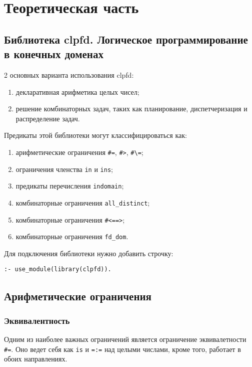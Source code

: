 \setcounter{page}{3}

\chapter{Теоретическая часть}



\section{Библиотека clpfd. Логическое программирование в конечных доменах}

2 основных варианта использования clpfd:

\begin{enumerate}
	\item декларативная арифметика целых чисел;
	\item решение комбинаторных задач, таких как планирование, диспетчеризация и распределение задач.
\end{enumerate}

Предикаты этой библиотеки могут классифицироваться как:

\begin{enumerate}
	\item арифметические ограничения \texttt{\#=}, \texttt{\#>}, \texttt{\#\textbackslash=};
	\item ограничения членства \texttt{in} и \texttt{ins};
	\item предикаты перечисления \texttt{indomain};
	\item комбинаторные ограничения \texttt{all\_distinct};
	\item комбинаторные ограничения \texttt{#<==>};
	\item комбинаторные ограничения \texttt{fd\_dom}.
\end{enumerate}

Для подключения библиотеки нужно добавить строчку:

\begin{lstlisting}[label=div,caption=Подключение]
:- use_module(library(clpfd)).
\end{lstlisting}


\section{Арифметические ограничения}
\subsection{Эквивалентность}
Одним из наиболее важных ограничений является ограничение эквивалетности \texttt{\#=}. Оно ведет себя как \texttt{is} и \texttt{=:=} над целыми числами, кроме того, работает в обоих направлениях.

